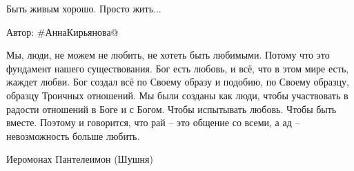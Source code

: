 Быть живым хорошо. Просто жить... 
 
Автор: #АннаКирьянова@

Мы, люди, не можем не любить, не хотеть быть любимыми. Потому что это фундамент нашего существования. Бог есть любовь, и всё, что в этом мире есть, жаждет любви. Бог создал всё по Своему образу и подобию, по Своему образцу, образцу Троичных отношений. Мы были созданы как люди, чтобы участвовать в радости отношений в Боге и с Богом. Чтобы испытывать любовь. Чтобы быть вместе. Поэтому и говорится, что рай – это общение со всеми, а ад – невозможность больше любить.

Иеромонах Пантелеимон (Шушня)

